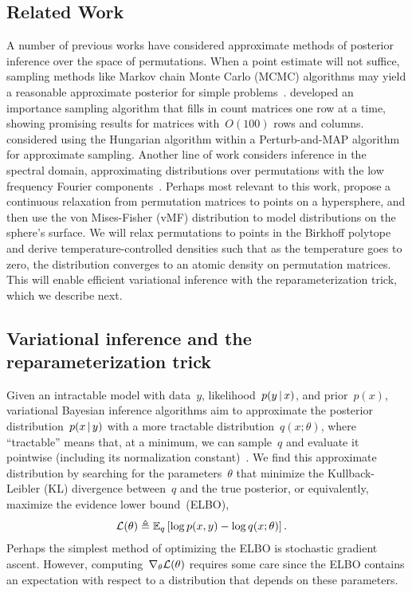 \documentclass[twoside]{article}
\begin{document}
\subsection{Related Work}
A number of previous works have considered approximate methods of
posterior inference over the space of permutations.  When a point
estimate will not suffice, sampling methods like Markov chain Monte
Carlo (MCMC) algorithms may yield a reasonable approximate posterior
for simple problems~\citep{diaconis1988group}.
\citet{harrison2013importance} developed an importance sampling
algorithm that fills in count matrices one row at a time, showing
promising results for matrices with~$O(100)$ rows and
columns. \citet{li2013efficient} considered using the Hungarian
algorithm within a Perturb-and-MAP algorithm for approximate sampling.
Another line of work considers inference in the spectral domain,
approximating distributions over permutations with the low frequency
Fourier components~\citep{kondor2007multi, huang2009fourier}.  Perhaps
most relevant to this work, \citet{plis2011directional} propose a
continuous relaxation from permutation matrices to points on a
hypersphere, and then use the von Mises-Fisher (vMF) distribution to
model distributions on the sphere's surface.
We will relax permutations to points in the Birkhoff polytope and
derive temperature-controlled densities such that as the
temperature goes to zero, the distribution converges to an atomic
density on permutation matrices.  This will enable efficient variational
inference with the reparameterization trick, which we describe next. 



\subsection{Variational inference and the reparameterization trick}
\label{sub:repa}
Given an intractable model with data~$y$, likelihood~$p(y \, | \, x)$,
and prior~$p(x)$, variational Bayesian inference algorithms aim to
approximate the posterior distribution~$p(x \, | \, y)$ with a more
tractable distribution~$q(x; \theta)$, where ``tractable'' means that,
at a minimum, we can sample~$q$ and evaluate it pointwise (including
its normalization constant)~\citep{Blei2017}.  We find this
approximate distribution by searching for the parameters~$\theta$ that
minimize the Kullback-Leibler (KL) divergence between~$q$ and the true
posterior, or equivalently, maximize the evidence lower bound~(ELBO),
\begin{align*}
  \mathcal{L}(\theta) &\triangleq \mathbb{E}_q \left[ \log p(x, y) - \log q(x; \theta) \right].
\end{align*}
Perhaps the simplest method of optimizing the ELBO is stochastic
gradient ascent.  However, computing~$\nabla_\theta \mathcal{L}(\theta)$
requires some care since the ELBO contains an expectation with respect
to a distribution that depends on these parameters.
\end{document}
